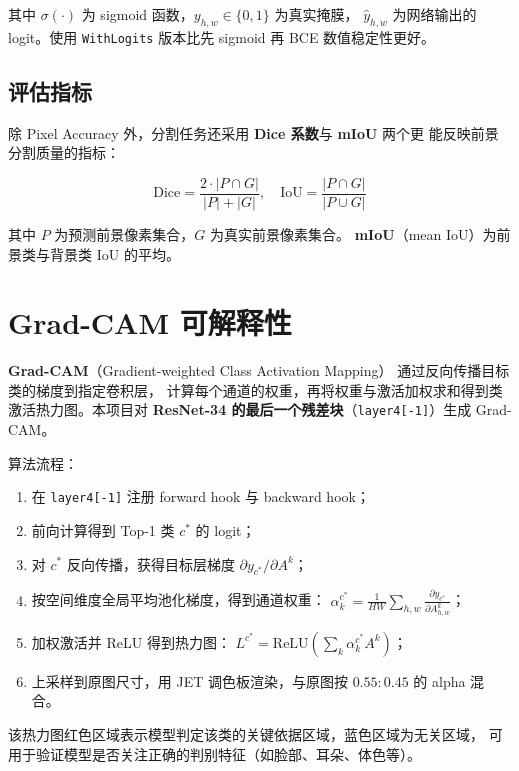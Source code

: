 \documentclass[12pt, a4paper, openany]{ctexbook}
\begin{document}
其中 $\sigma(\cdot)$ 为 sigmoid 函数，$y_{h,w} \in \{0, 1\}$ 为真实掩膜，
$\hat{y}_{h,w}$ 为网络输出的 logit。使用 \texttt{WithLogits} 版本比先 sigmoid
再 BCE 数值稳定性更好。

\subsection{评估指标}

除 Pixel Accuracy 外，分割任务还采用 \textbf{Dice 系数}与 \textbf{mIoU} 两个更
能反映前景分割质量的指标：

\begin{equation}
  \text{Dice} = \frac{2 \cdot |P \cap G|}{|P| + |G|},\quad
  \text{IoU}  = \frac{|P \cap G|}{|P \cup G|}
\end{equation}

其中 $P$ 为预测前景像素集合，$G$ 为真实前景像素集合。
\textbf{mIoU}（mean IoU）为前景类与背景类 IoU 的平均。

\section{Grad-CAM 可解释性}

\textbf{Grad-CAM}（Gradient-weighted Class Activation Mapping）
\cite{selvaraju2017gradcam} 通过反向传播目标类的梯度到指定卷积层，
计算每个通道的权重，再将权重与激活加权求和得到类激活热力图。本项目对
\textbf{ResNet-34 的最后一个残差块}（\texttt{layer4[-1]}）生成 Grad-CAM。

算法流程：

\begin{enumerate}[leftmargin=*]
  \item 在 \texttt{layer4[-1]} 注册 forward hook 与 backward hook；
  \item 前向计算得到 Top-1 类 $c^*$ 的 logit；
  \item 对 $c^*$ 反向传播，获得目标层梯度 $\partial y_{c^*} / \partial A^k$；
  \item 按空间维度全局平均池化梯度，得到通道权重：
        $\alpha_k^{c^*} = \frac{1}{HW}\sum_{h,w} \frac{\partial y_{c^*}}{\partial A_{h,w}^k}$；
  \item 加权激活并 ReLU 得到热力图：
        $L^{c^*} = \text{ReLU}\left(\sum_k \alpha_k^{c^*} A^k\right)$；
  \item 上采样到原图尺寸，用 JET 调色板渲染，与原图按 $0.55:0.45$ 的 alpha 混合。
\end{enumerate}

该热力图红色区域表示模型判定该类的关键依据区域，蓝色区域为无关区域，
可用于验证模型是否关注正确的判别特征（如脸部、耳朵、体色等）。
\end{document}
